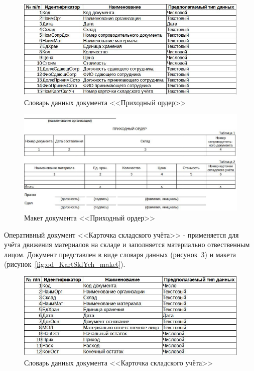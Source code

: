 \documentclass[12pt, a4paper, simple]{eskdtext}
\begin{document}
    \begin{figure}[p!h]
        \centering
        \includegraphics[]
            {_docs/ОД_ПрихОрд_типы.jpg}
        \caption{Словарь данных документа <<Приходный ордер>>}
        \label{fig:od_PrihOrd_tipi}
    \end{figure}

    \begin{figure}[p!h]
        \centering
        \includegraphics[width=16cm]
            {_docs/ОД_ПрихОрд_макет.jpg}
        \caption{Макет документа <<Приходный ордер>>}
        \label{fig:od_PrihOrd_maket}
    \end{figure}


    \newpage
    Оперативный документ <<Карточка складского учёта>> - применяется для учёта движения материалов на складе
    и заполняется материально отвественным лицом.
    Документ представлен в виде словаря данных (рисунок~\ref{fig:od_KartSklYch_tipi})
    и макета (рисунок~\ref{fig:od_KartSklYch_maket}).

    \begin{figure}[p!h]
        \centering
        \includegraphics[]
            {_docs/ОД_КартСклУч_типы.jpg}
        \caption{Словарь данных документа <<Карточка складского учёта>>}
        \label{fig:od_KartSklYch_tipi}
    \end{figure}
\end{document}
